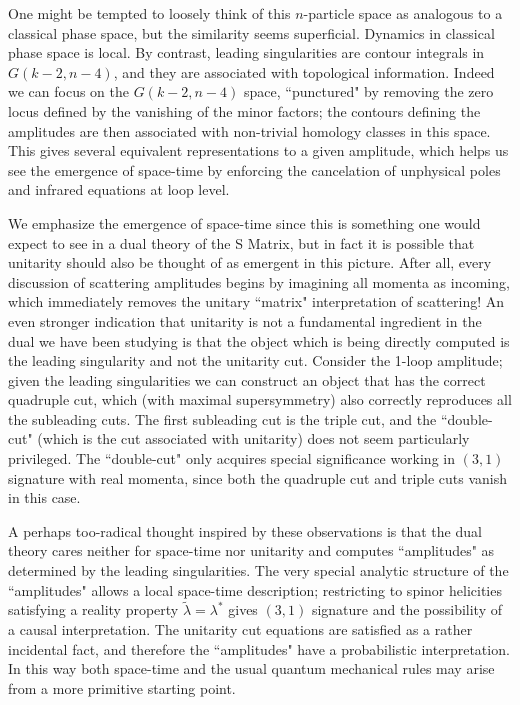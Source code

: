 \documentclass[12pt]{article}
\begin{document}
One might be tempted to loosely think of this $n$-particle space as analogous to a classical phase space, but the similarity seems superficial. Dynamics in classical phase space is local. By contrast, leading singularities are contour integrals in $G(k-2,n-4)$, and they are associated with topological information. Indeed we can focus on the
$G(k-2,n-4)$ space, ``punctured" by removing the zero locus defined by the vanishing of the minor factors; the contours defining the amplitudes are then associated with non-trivial homology classes in this space. This gives several equivalent representations to a given amplitude, which helps us see the emergence of space-time by enforcing the cancelation of unphysical poles and infrared equations at loop level.

We emphasize the emergence of space-time since this is something one would expect to see in a dual theory of the S Matrix, but in fact it is possible that unitarity should also be thought of as emergent in this picture. After all, every discussion of scattering amplitudes begins by imagining all momenta as incoming, which immediately removes the unitary ``matrix" interpretation of scattering! An even stronger indication that unitarity is not a fundamental ingredient in the dual we have been studying is that the object which is being directly computed is the
leading singularity and not the unitarity cut. Consider the 1-loop amplitude; given the leading singularities we can construct an object that has the correct quadruple cut, which (with maximal supersymmetry) also correctly reproduces all the subleading cuts. The first subleading cut is the triple cut, and the ``double-cut" (which is the cut associated with unitarity) does not seem particularly privileged. The ``double-cut" only acquires special significance working in $(3,1)$ signature with real momenta, since both the quadruple cut and triple cuts vanish in this case.

A perhaps too-radical thought inspired by these observations is that the dual theory cares neither for space-time nor unitarity and computes ``amplitudes" as determined by the leading singularities. The very special analytic structure of the ``amplitudes" allows a local space-time description; restricting to spinor helicities satisfying a reality property $\tilde \lambda = \lambda^*$ gives $(3,1)$ signature and the possibility of a causal interpretation. The unitarity cut equations are satisfied as a rather incidental fact, and therefore the ``amplitudes" have a probabilistic interpretation. In this way both space-time and the usual quantum mechanical rules may arise from a more primitive starting point.
\end{document}
